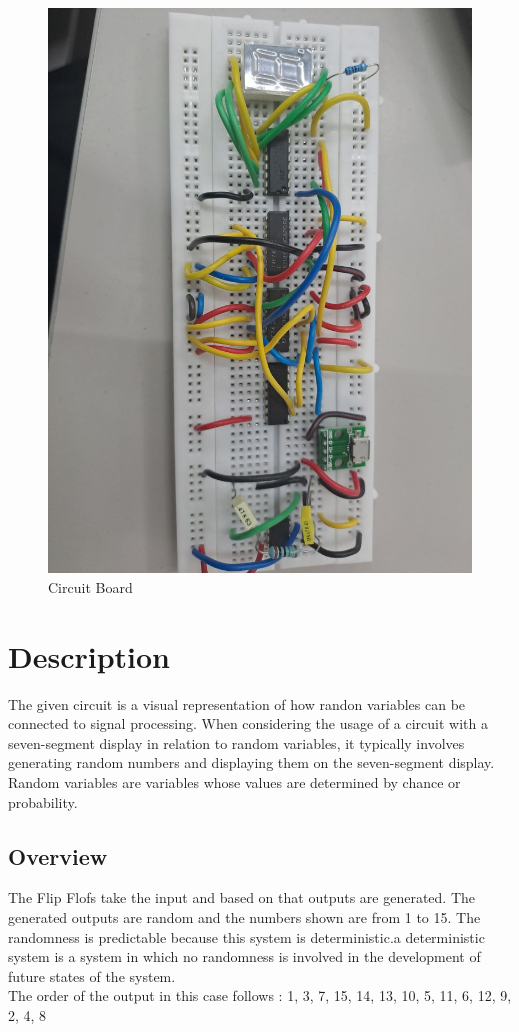 \documentclass{article}
\begin{document}
\begin{figure}[ht]
        \centering
        \includegraphics[width=1\linewidth]{projimage.jpg}
        \caption{Circuit Board}
        \label{fig:view}
\end{figure}

\section{Description}
The given circuit is a visual representation of how randon variables can be connected to signal processing.
When considering the usage of a circuit with a seven-segment display in relation to random variables, it typically involves generating random numbers and displaying them on the seven-segment display. Random variables are variables whose values are determined by chance or probability.

\subsection{Overview}
The Flip Flofs take the input and based on that outputs are generated. The generated outputs are random and the numbers shown are from 1 to 15. The randomness is predictable because this system is deterministic.a deterministic system is a system in which no randomness is involved in the development of future states of the system.\\
The order of the output in this case follows : 1, 3, 7, 15, 14, 13, 10, 5, 11, 6, 12, 9, 2, 4, 8
\end{document}
